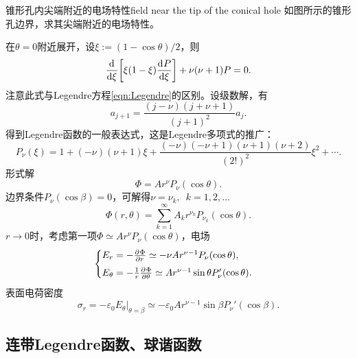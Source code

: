 \begin{example}{锥形孔内尖端附近的电场特性}{field near the tip of the conical hole}
    如图所示的锥形孔边界，求其尖端附近的电场特性。
    \begin{center}
    \end{center}
    在$\theta=0$附近展开，设$\xi:=(1-\cos\theta)/2$，则 
    \[
        \frac{\mathrm{d}^{{}}}{\mathrm{d}{\xi}^{{}}}\biggl[\xi(1-\xi)\frac{\mathrm{d}^{{}}P}{\mathrm{d}{\xi}^{{}}}\biggr]+\nu(\nu+1)P=0.
    \]
    注意此式与Legendre方程\eqref{eqn:Legendre}的区别。设级数解，有
    \[
        a_{j+1}=\frac{(j-\nu)(j+\nu+1)}{(j+1)^2}a_j.
    \]
    得到Legendre函数的一般表达式，这是Legendre多项式的推广：
    \[
        P_\nu(\xi)=1+(-\nu)(\nu+1)\xi+\frac{(-\nu)(-\nu+1)(\nu+1)(\nu+2)}{(2!)^2}\xi^2+\cdots.
    \]
    形式解
    \[
        \Phi=Ar^\nu P_\nu(\cos\theta).
    \]
    边界条件$P_\nu(\cos\beta)=0$，可解得$\nu=\nu_k,\enspace k=1,2,\ldots$
    \[
        \Phi(r,\theta)=\sum_{k=1}^\infty A_kr^{\nu_k}P_{\nu_k}(\cos\theta).
    \]
    $r\to 0$时，考虑第一项$\Phi\simeq Ar^\nu P_\nu(\cos\theta)$，电场
    \[
        \begin{cases}
            E_r=-\frac{\partial^{{}}\Phi}{\partial{r}^{{}}}\simeq-\nu Ar^{\nu-1}P_\nu(\cos\theta),\\[1ex]
            E_\theta=-\frac1r\frac{\partial^{{}}\Phi}{\partial{\theta}^{{}}}\simeq Ar^{\nu-1}\sin\theta P'_\nu(\cos\theta).
        \end{cases}
    \]
    表面电荷密度
    \[
        \sigma_r=-\varepsilon_0E_\theta|_{\theta=\beta}\simeq-\varepsilon_0Ar^{\nu-1}\sin\beta P_\nu'(\cos\beta).
    \]
\end{example}

\subsection{连带Legendre函数、球谐函数}
\label{ssec:associated Legendre function and spherical harmonics}

